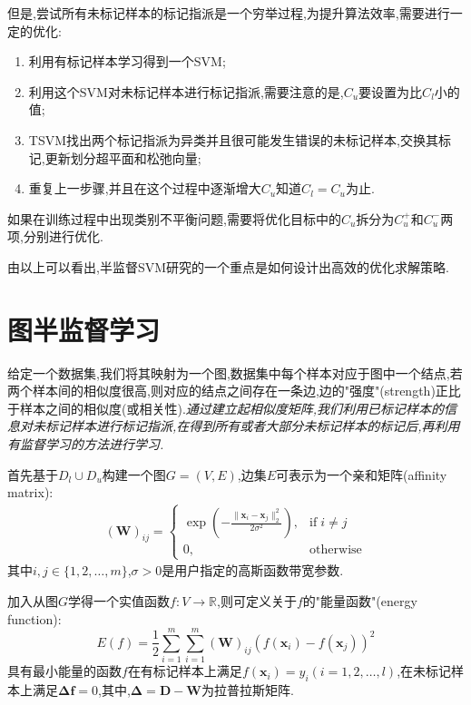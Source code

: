 但是,尝试所有未标记样本的标记指派是一个穷举过程,为提升算法效率,需要进行一定的优化:
\begin{enumerate}
\item 利用有标记样本学习得到一个SVM;
\item 利用这个SVM对未标记样本进行标记指派,需要注意的是,$C_u$要设置为比$C_l$小的值;
\item TSVM找出两个标记指派为异类并且很可能发生错误的未标记样本,交换其标记,更新划分超平面和松弛向量;
\item 重复上一步骤,并且在这个过程中逐渐增大$C_u$知道$C_l=C_u$为止.
\end{enumerate}

如果在训练过程中出现类别不平衡问题,需要将优化目标中的$C_u$拆分为$C_u^+$和$C_u^-$两项,分别进行优化.

由以上可以看出,半监督SVM研究的一个重点是如何设计出高效的优化求解策略.

\section{图半监督学习}

给定一个数据集,我们将其映射为一个图,数据集中每个样本对应于图中一个结点,若两个样本间的相似度很高,则对应的结点之间存在一条边,边的"强度"(strength)正比于样本之间的相似度(或相关性).\textit{通过建立起相似度矩阵,我们利用已标记样本的信息对未标记样本进行标记指派,在得到所有或者大部分未标记样本的标记后,再利用有监督学习的方法进行学习.}

首先基于$D_l\cup D_u$构建一个图$G=(V,E)$,边集$E$可表示为一个亲和矩阵(affinity matrix):
\begin{equation}\begin{split}
(\mathbf W)_{ij}=\begin{cases}
\exp(-\frac{\|\mathbf x_i-\mathbf x_j\|_2^2}{2\sigma^2}),&\text{if}\;i\ne j\\
0,&\text{otherwise}
\end{cases}\end{split}\end{equation}
其中$i,j\in\{1,2,\dots,m\}$,$\sigma>0$是用户指定的高斯函数带宽参数.

加入从图$G$学得一个实值函数$f:V\to\mathbb R$,则可定义关于$f$的"能量函数"(energy function):
\begin{equation}
E(f)=\frac{1}{2}\sum_{i=1}^m\sum_{i=1}^m(\mathbf W)_{ij}(f(\mathbf x_i)-f(\mathbf x_j))^2
\end{equation}
具有最小能量的函数$f$在有标记样本上满足$f(\mathbf x_i)=y_i(i=1,2,\dots,l)$,在未标记样本上满足$\mathbf\Delta\mathbf f=0$,其中,$\mathbf\Delta=\mathbf D-\mathbf W$为拉普拉斯矩阵.


